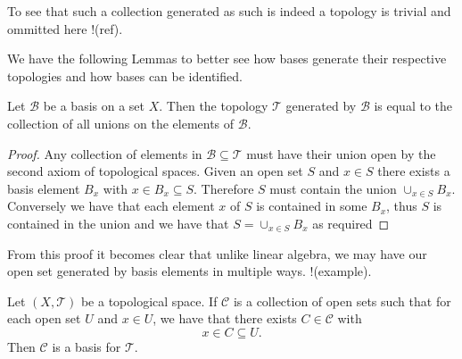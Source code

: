 To see that such a collection generated as such is indeed a topology
is trivial and ommitted here !(ref).

We have the following Lemmas to better see how bases generate their
respective topologies and how bases can be identified.

\begin{lem}
  \label{lem:union}
  Let $\mathscr{B}$ be a basis on a set $X$. Then the topology
  $\mathscr{T}$ generated by $\mathscr{B}$ is equal to the collection
  of all unions on the elements of $\mathscr{B}$.
\end{lem}

\begin{proof}
  Any collection of elements in $\mathscr{B} \subseteq \mathscr{T}$
  must have their union open by the second axiom of topological
  spaces. Given an open set $S$ and $x \in S$ there exists a basis
  element $B_x$ with $x \in B_x \subseteq S$. Therefore $S$ must
  contain the union $\cup_{x \in S} B_x$. Conversely we have that each
  element $x$ of $S$ is contained in some $B_x$, thus $S$ is contained
  in the union and we have that $S = \cup_{x \in S} B_x$ as required
\end{proof}

From this proof it becomes clear that unlike linear algebra, we may
have our open set generated by basis elements in multiple
ways. !(example).

\begin{lem}
  \label{lem:collection}
  Let $(X,\mathscr{T})$ be a topological space. If $\mathscr{C}$ is a
  collection of open sets such that for each open set $U$ and $x \in
  U$, we have that there exists $C \in \mathscr{C}$ with 
  \[
    x \in C \subseteq U.
  \]
  Then $\mathscr{C}$ is a basis for $\mathscr{T}$.
\end{lem}

